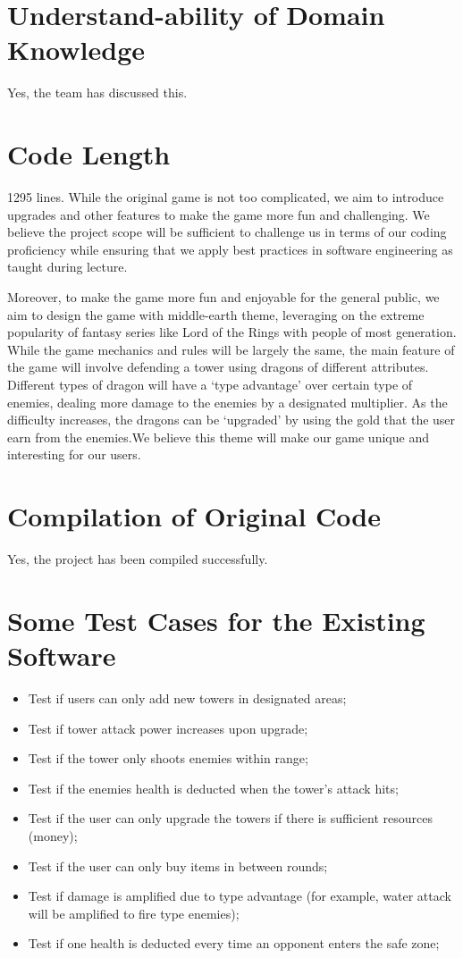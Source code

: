 \documentclass[12pt]{article}
\begin{document}
\section{Understand-ability of Domain Knowledge}
Yes, the team has discussed this.

\section{Code Length}
1295 lines. While the original game is not too complicated, we aim to introduce upgrades and other features to make the game more fun and challenging. We believe the project scope will be sufficient to challenge us in terms of our coding proficiency while ensuring that we apply best practices in software engineering as taught during lecture.

Moreover, to make the game more fun and enjoyable for the general public, we aim to design the game with middle-earth theme, leveraging on the extreme popularity of fantasy series like Lord of the Rings with people of most generation. While the game mechanics and rules will be largely the same, the main feature of the game will involve defending a tower using dragons of different attributes. Different types of dragon will have a ‘type advantage’ over certain type of enemies, dealing more damage to the enemies by a designated multiplier. As the difficulty increases, the dragons can be ‘upgraded’ by using the gold that the user earn from the enemies.We believe this theme will make our game unique and interesting for our users.

\section{Compilation of Original Code}
Yes, the project has been compiled successfully.

\section{Some Test Cases for the Existing Software}
    \begin{itemize}
        \item Test if users can only add new towers in designated areas;
        \item Test if tower attack power increases upon upgrade;
        \item Test if the tower only shoots enemies within range;
        \item Test if the enemies health is deducted when the tower’s attack hits;
        \item Test if the user can only upgrade the towers if there is sufficient resources (money);
        \item Test if the user can only buy items in between rounds;
        \item Test if damage is amplified due to type advantage (for example, water attack will be amplified to fire type enemies);
        \item Test if one health is deducted every time an opponent enters the safe zone;
    \end{itemize}
\end{document}
